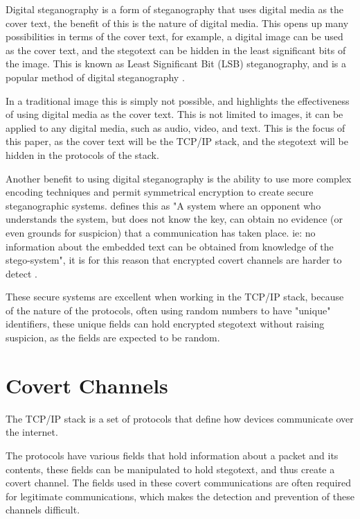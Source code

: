 Digital steganography is a form of steganography that uses digital media as the cover text, the benefit of this is the nature of digital media. This opens up many possibilities in terms of the cover text, for example, a digital image can be used as the cover text, and the stegotext can be hidden in the least significant bits of the image. This is known as Least Significant Bit (LSB) steganography, and is a popular method of digital steganography \citep{AESTfHD}.

In a traditional image this is simply not possible, and highlights the effectiveness of using digital media as the cover text. This is not limited to images, it can be applied to any digital media, such as audio, video, and text. This is the focus of this paper, as the cover text will be the TCP/IP stack, and the stegotext will be hidden in the protocols of the stack.

Another benefit to using digital steganography is the ability to use more complex encoding techniques and permit symmetrical encryption to create secure steganographic systems. \cite{SaW} defines this as "A system where an opponent who understands the system, but does not know the key, can obtain no evidence (or even grounds for suspicion) that a communication has taken place. ie: no information about the embedded text can be obtained from knowledge of the stego-system", it is for this reason that encrypted covert channels are harder to detect \citep{CCitTCPIPPS}.

These secure systems are excellent when working in the TCP/IP stack, because of the nature of the protocols, often using random numbers to have "unique" identifiers, these unique fields can hold encrypted stegotext without raising suspicion, as the fields are expected to be random.

\section{Covert Channels}

The TCP/IP stack is a set of protocols that define how devices communicate over the internet.

The protocols have various fields that hold information about a packet and its contents, these fields can be manipulated to hold stegotext, and thus create a covert channel. The fields used in these covert communications are often required for legitimate communications, which makes the detection and prevention of these channels difficult.

